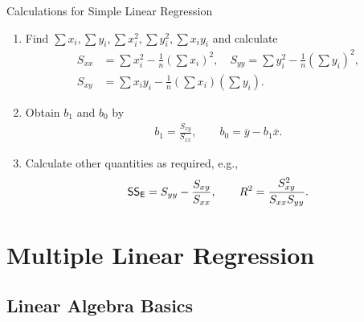 \begin{frame}{Calculations for Simple Linear Regression}


\begin{enumerate}
	\justifying
	\item Find $\sum x_i, \sum y_i, \sum x_i^2, \sum y_i^2, \sum x_iy_i$ and calculate
	\begin{align*}
	S_{xx} & = \sum x_i^2 - \frac{1}{n}\left(\sum x_i \right)^2, \quad S_{yy} = \sum y_i^2 - \frac{1}{n}\left(\sum y_i \right)^2,\\
	S_{xy} & = \sum x_iy_i - \frac{1}{n}\left(\sum x_i \right)\left(\sum y_i \right).
	\end{align*}
	\item Obtain $b_1$ and $b_0$ by
	\begin{align*}
	b_1 = \frac{S_{xy}}{S_{xx}}, \qquad b_0 = \overline{y} - b_1\overline{x}.
	\end{align*}
	\item Calculate other quantities as required, e.g.,
	\begin{align*}
	\mathsf{SS_E} = S_{yy} - \frac{S_{xy}}{S_{xx}}, \qquad R^2 = \frac{S_{xy}^2}{S_{xx}S_{yy}}.
	\end{align*}
\end{enumerate}


\end{frame}


\section{Multiple Linear Regression}


\subsection{Linear Algebra Basics}


